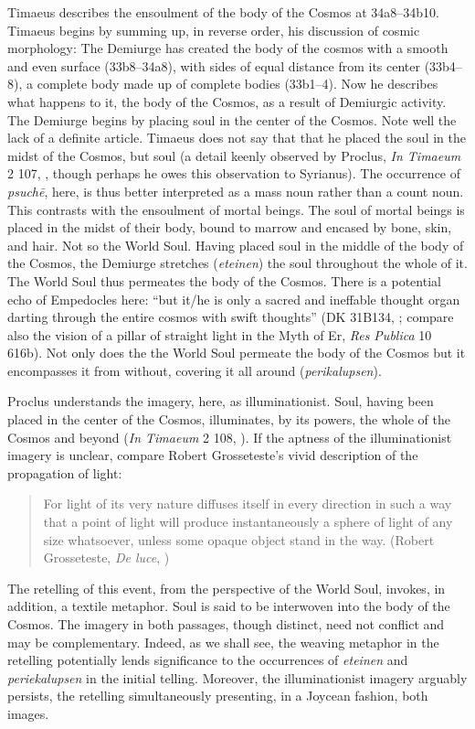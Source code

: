 Timaeus describes the ensoulment of the body of the Cosmos at 34a8--34b10. Timae\-us begins by summing up, in reverse order, his discussion of cosmic morphology: The Demiurge has created the body of the cosmos with a smooth and even surface (33b8--34a8), with sides of equal distance from its center (33b4--8), a complete body made up of complete bodies (33b1--4). Now he describes what happens to it, the body of the Cosmos, as a result of Demiurgic activity. The Demiurge begins by placing soul in the center of the Cosmos. Note well the lack of a definite article. Timaeus does not say that that he placed the soul in the midst of the Cosmos, but soul (a detail keenly observed by Proclus, \emph{In Timaeum} 2 107, \citealt{Diehl:1903re}, though perhaps he owes this observation to Syrianus). The occurrence of \emph{psuchē}, here, is thus better interpreted as a mass noun rather than a count noun. This contrasts with the ensoulment of mortal beings. The soul of mortal beings is placed in the midst of their body, bound to marrow and encased by bone, skin, and hair. Not so the World Soul. Having placed soul in the middle of the body of the Cosmos, the Demiurge stretches (\emph{eteinen}) the soul throughout the whole of it. The World Soul thus permeates the body of the Cosmos. There is a potential echo of Empedocles here: ``but it/he is only a sacred and ineffable thought organ darting through the entire cosmos with swift thoughts'' (DK 31B134, \citealt[263]{Inwood:2001ve}; compare also the vision of a pillar of straight light in the Myth of Er, \emph{Res Publica} 10 616b). Not only does the the World Soul permeate the body of the Cosmos but it encompasses it from without, covering it all around (\emph{perikalupsen}). 

Proclus understands the imagery, here, as illuminationist. Soul, having been placed in the center of the Cosmos, illuminates, by its powers, the whole of the Cosmos and beyond (\emph{In Timaeum} 2 108, \citealt{Diehl:1903re}). If the aptness of the illuminationist imagery is unclear, compare Robert Grosseteste's vivid description of the propagation of light:
\begin{quote}
	For light of its very nature diffuses itself in every direction in such a way that a point of light will produce instantaneously a sphere of light of any size whatsoever, unless some opaque object stand in the way. (Robert Grosseteste, \emph{De luce}, \citealt[10]{Riedl:1942it})
\end{quote}
The retelling of this event, from the perspective of the World Soul, invokes, in addition, a textile metaphor. Soul is said to be interwoven into the body of the Cosmos. The imagery in both passages, though distinct, need not conflict and may be complementary. Indeed, as we shall see, the weaving metaphor in the retelling potentially lends significance to the occurrences of \emph{eteinen} and \emph{periekalupsen} in the initial telling. Moreover, the illuminationist imagery arguably persists, the retelling simultaneously presenting, in a Joycean fashion, both images.

